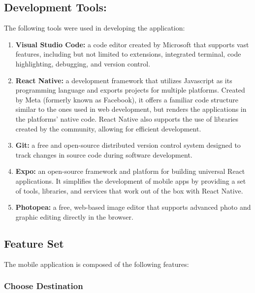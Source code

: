 \documentclass[journal]{./IEEE/IEEEtran}
\begin{document}
\subsection{Development Tools:}
The following tools were used in developing the application:
\begin{enumerate}
   \item \textbf{Visual Studio Code:} a code editor created by Microsoft that supports vast features, including but not limited to extensions, integrated terminal, code highlighting, debugging, and version control.
   \item \textbf{React Native:} a development framework that utilizes Javascript as its programming language and exports projects for multiple platforms. Created by Meta (formerly known as Facebook), it offers a familiar code structure similar to the ones used in web development, but renders the applications in the platforms’ native code. React Native also supports the use of libraries created by the community, allowing for efficient development.
   \item \textbf{Git:} a free and open-source distributed version control system designed to track changes in source code during software development.
   \item \textbf{Expo:} an open-source framework and platform for building universal React applications. It simplifies the development of mobile apps by providing a set of tools, libraries, and services that work out of the box with React Native.
   \item \textbf{Photopea:} a free, web-based image editor that supports advanced photo and graphic editing directly in the browser.
   

 \end{enumerate}

\subsection{Feature Set}
The mobile application is composed of the following features:
\newline

\subsubsection{\textbf{Choose Destination}}
\end{document}
